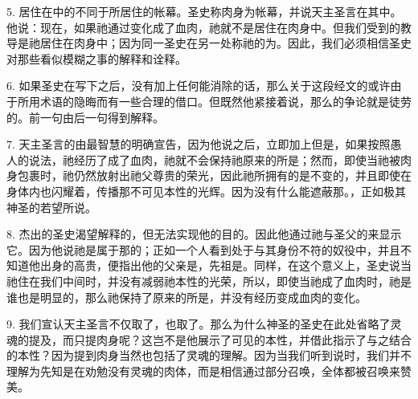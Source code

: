 5. 居住在中的不同于所居住的帐幕。圣史称肉身为帐幕，并说天主圣言在其中。他说：现在，如果祂通过变化成了血肉，祂就不是居住在肉身中。但我们受到的教导是祂居住在肉身中；因为同一圣史在另一处称祂的为。因此，我们必须相信圣史对那些看似模糊之事的解释和诠释。\par

6. 如果圣史在写下之后，没有加上任何能消除的话，那么关于这段经文的或许由于所用术语的隐晦而有一些合理的借口。但既然他紧接着说，那么的争论就是徒劳的。前一句由后一句得到解释。\par

7. 天主圣言的由最智慧的明确宣告，因为他说之后，立即加上但是，如果按照愚人的说法，祂经历了成了血肉，祂就不会保持祂原来的所是；然而，即使当祂被肉身包裹时，祂仍然放射出祂父尊贵的荣光，因此祂所拥有的是不变的，并且即使在身体内也闪耀着，传播那不可见本性的光辉。因为没有什么能遮蔽那。，正如极其神圣的若望所说。\par

8. 杰出的圣史渴望解释的，但无法实现他的目的。因此他通过祂与圣父的来显示它。因为他说祂是属于那的；正如一个人看到处于与其身份不符的奴役中，并且不知道他出身的高贵，便指出他的父亲是，先祖是。同样，在这个意义上，圣史说当祂住在我们中间时，并没有减弱祂本性的光荣，所以，即使当祂成了血肉时，祂是谁也是明显的，那么祂保持了原来的所是，并没有经历变成血肉的变化。\par

9. 我们宣认天主圣言不仅取了，也取了。那么为什么神圣的圣史在此处省略了灵魂的提及，而只提肉身呢？这岂不是他展示了可见的本性，并借此指示了与之结合的本性？因为提到肉身当然也包括了灵魂的理解。因为当我们听到说时，我们并不理解为先知是在劝勉没有灵魂的肉体，而是相信通过部分召唤，全体都被召唤来赞美。\par

